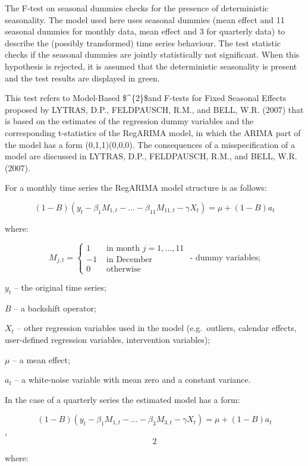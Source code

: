 \documentclass[
  letterpaper,
  DIV=11,
  numbers=noendperiod]{scrreprt}
\begin{document}
The F-test on seasonal dummies checks for the presence of deterministic
seasonality. The model used here uses seasonal dummies (mean effect and
11 seasonal dummies for monthly data, mean effect and 3 for quarterly
data) to describe the (possibly transformed) time series behaviour. The
test statistic checks if the seasonal dummies are jointly statistically
not significant. When this hypothesis is rejected, it is assumed that
the deterministic seasonality is present and the test results are
displayed in green.

This test refers to Model-Based \$\chi\^{}\{2\}\$and F-tests for Fixed
Seasonal Effects proposed by LYTRAS, D.P., FELDPAUSCH, R.M., and BELL,
W.R. (2007) that is based on the estimates of the regression dummy
variables and the corresponding t-statistics of the RegARIMA model, in
which the ARIMA part of the model has a form (0,1,1)(0,0,0). The
consequences of a misspecification of a model are discussed in LYTRAS,
D.P., FELDPAUSCH, R.M., and BELL, W.R. (2007).

For a monthly time series the RegARIMA model structure is as follows:

\[\left( 1 - B \right)\left( y_{t} - \beta_{1}M_{1,t} - \ldots - \beta_{11}M_{11,t} - \gamma X_{t} \right) = \mu + (1 - B)a_{t}
\]

where:

\[
M_{j,t} =
\begin{cases}
1 & \text{ in month } j = 1, \ldots, 11 \\
- 1 & \text{ in December}\\
0 & \text{ otherwise}
\end{cases} \text{ - dummy variables;}
\]

\(y_{t}\) -- the original time series;

\(B\) -- a backshift operator;

\(X_{t}\) -- other regression variables used in the model
(e.g.~outliers, calendar effects, user-defined regression variables,
intervention variables);

\(\mu\) -- a mean effect;

\(a_{t}\) -- a white-noise variable with mean zero and a constant
variance.

In the case of a quarterly series the estimated model has a form:

\[\left( 1 - B \right)\left( y_{t} - \beta_{1}M_{1,t} - \ldots - \beta_{3}M_{3,t} - \gamma X_{t} \right) = \mu + (1 - B)a_{t}\],
\[2\]

where:
\end{document}
